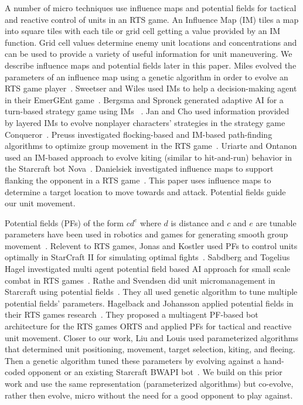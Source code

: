 \documentclass[conference,10pt]{IEEEtran}
\begin{document}

A number of micro techniques use influence maps and potential fields
for tactical and reactive control of units in an RTS game. An
Influence Map (IM) tiles a map into square tiles with each tile or
grid cell getting a value provided by an IM function. Grid cell values
determine enemy unit locations and concentrations and can be used to
provide a variety of useful information for unit maneuvering. We
describe influence maps and potential fields later in this
paper. Miles evolved the parameters of an influence map using a
genetic algorithm in order to evolve an RTS game
player~\cite{CIMTBSGP07}. Sweetser and Wiles used IMs to help a
decision-making agent in their EmerGEnt
game~\cite{CIMACAFRGA05}. Bergsma and Spronck generated adaptive AI
for a turn-based strategy game using IMs ~\cite{ASRFTSG08}. Jan and
Cho used information provided by layered IMs to evolve nonplayer
characters' strategies in the strategy game
Conqueror~\cite{ENNWLIMITRSGC08}. Preuss investigated flocking-based
and IM-based path-finding algorithms to optimize group movement in the
RTS game~\cite{preuss2010towards}. Uriarte and
Ontanon used an IM-based approach to evolve kiting (similar to
hit-and-run) behavior in the Starcraft bot
Nova~\cite{KIRGUIM12}. Danielsiek investigated influence maps to
support flanking the opponent in a RTS game~\cite{IMOGIRTSG08}. This
paper uses influence maps to determine a target location to move
towards and attack. Potential fields guide our unit movement.

Potential fields (PFs) of the form $cd^e$ where $d$ is distance and
$c$ and $e$ are tunable parameters have been used in robotics and
games for generating smooth group movement~\cite{ROAFMAMR86}. Relevent to
RTS games, Jonas and Kostler used PFs to control units optimally in
StarCraft II for simulating optimal
fights~\cite{IAGAFSOFIS16}. Sabdberg and Togelius Hagel investigated
multi agent potential field based AI approach for small scale combat
in RTS games~\cite{EMPFBAAFSSIRG11}. Rathe and Svendsen did unit
micromanagement in Starcraft using potential
fields~\cite{MISUPFTWMOGA12}. They all used genetic algorithm to tune
multiple potential fields' parameters. Hagelback and Johansson applied
potential fields in their RTS games research~\cite{UMPFIRSG08}. They
proposed a multiagent PF-based bot architecture for the RTS games ORTS
and applied PFs for tactical and reactive unit movement. 
Closer to our work, Liu and Louis used parameterized algorithms that
determined unit positioning, movement, target selection, kiting, and
fleeing. Then a genetic algorithm tuned these parameters by evolving
against a hand-coded opponent or an existing Starcraft BWAPI
bot~\cite{EEMIRSG16}. We build on this prior work and use the same
representation (parameterized algorithms) but co-evolve, rather then
evolve, micro without the need for a good opponent to play
against.
\end{document}
